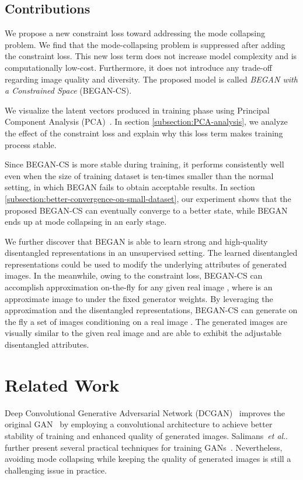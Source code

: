 \documentclass[runningheads]{llncs}
\makeatletter
\DeclareRobustCommand\onedot{\futurelet\@let@token\@onedot}
\def\@onedot{\ifx\@let@token.\else.\null\fi\xspace}
\def\etal{\emph{et al}\onedot}
\makeatother
\begin{document}
    
    \subsection{Contributions}
    
    We propose a new constraint loss toward addressing the mode collapsing problem. We find that the mode-collapsing problem is suppressed after adding the constraint loss. This new loss term does not increase model complexity and is computationally low-cost. Furthermore, it does not introduce any trade-off regarding image quality and diversity. 
    The proposed model is called \emph{BEGAN with a Constrained Space} (BEGAN-CS).
   
    
    We visualize the latent vectors produced in training phase using Principal Component Analysis (PCA)~\cite{PCA}. In section \ref{subsection:PCA-analysis}, we analyze the effect of the constraint loss and explain why this loss term makes training process stable.
    
    Since BEGAN-CS is more stable during training, it performs consistently well even when the size of training dataset is ten-times smaller than the normal setting, in which BEGAN fails to obtain acceptable results. In section \ref{subsection:better-convergence-on-small-dataset}, our experiment shows that the proposed BEGAN-CS can eventually converge to a better state, while BEGAN ends up at mode collapsing in an early stage.
    
    We further discover that BEGAN is able to learn strong and high-quality disentangled representations in an unsupervised setting. The learned disentangled representations could be used to modify the underlying attributes of generated images. In the meanwhile, owing to the constraint loss, BEGAN-CS can accomplish approximation  on-the-fly for any given real image , where  is an approximate image to  under the fixed generator weights. 
    By leveraging the  approximation and the disentangled representations, BEGAN-CS can generate on the fly a set of images conditioning on a real image . The generated images are visually similar to the given real image and are able to exhibit the adjustable disentangled attributes.
    

\section{Related Work} 
    
    Deep Convolutional Generative Adversarial Network (DCGAN)~\cite{DCGAN} improves the original GAN~\cite{GAN} by employing a convolutional architecture to achieve better stability of training and enhanced quality of generated images. Salimans~\etal further present several practical techniques for training GANs~\cite{SalimansGZCRCC16}. Nevertheless, avoiding mode collapsing while keeping the quality of generated images is still a challenging issue in practice. 
     
\end{document}
